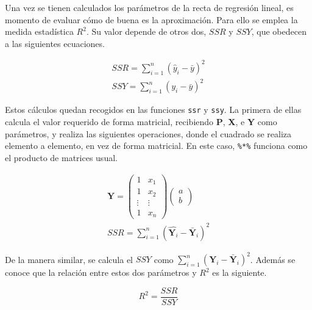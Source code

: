 \documentclass[12pt]{report}\usepackage[]{graphicx}\usepackage[dvipsnames]{xcolor}
\begin{document}
 				Una vez se tienen calculados los parámetros de la recta de regresión lineal, es momento de evaluar cómo de buena es la aproximación. Para ello se emplea la medida estadística $R^2$. Su valor depende de otros dos, $SSR$ y $SSY$, que obedecen a las siguientes ecuaciones. 
 				
 				$$
 				\begin{gathered}
 					SSR = \sum_{i=1}^n(\hat{y}_i - \bar{y})^2\\
 					SSY = \sum_{i=1}^n(y_i - \bar{y})^2
 				\end{gathered}
 				$$
 				
 				Estos cálculos quedan recogidos en las funciones \texttt{ssr} y \texttt{ssy}. La primera de ellas calcula el valor requerido de forma matricial, recibiendo \textbf{P}, \textbf{X}, e \textbf{Y} como parámetros, y realiza las siguientes operaciones, donde el cuadrado se realiza elemento a elemento, en vez de forma matricial. En este caso, \texttt{\%*\%} funciona como el producto de matrices usual. 
 				
 				$$
 				\begin{gathered}
 					\hat{\textbf{Y}} = \begin{pmatrix}
 						1 & x_1\\
 						1 & x_2\\
 						\vdots & \vdots\\
 						1 & x_n
 					\end{pmatrix}\begin{pmatrix}
 						a\\
 						b
 					\end{pmatrix}\\
 					SSR = \sum_{i=1}^n (\hat{\textbf{Y}_i} - \bar{\textbf{Y}}_i)^2
 				\end{gathered}
 				$$
 				
 				De la manera similar, se calcula el $SSY$ como $\sum_{i=1}^n (\textbf{Y}_i - \bar{\textbf{Y}}_i)^2$. Además se conoce que la relación entre estos dos parámetros y $R^2$ es la siguiente. 
 				
 				$$
 				R^2 = \frac{SSR}{SSY}
 				$$
 				
\end{document}
